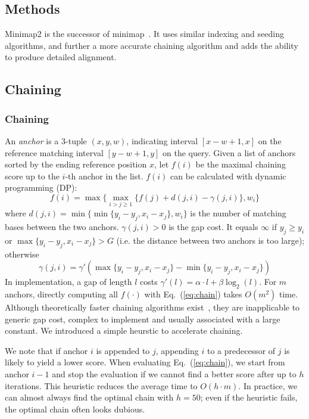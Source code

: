 \documentclass{bioinfo}
\begin{document}
\begin{methods}
\section{Methods}

Minimap2 is the successor of minimap~\citep{Li:2016aa}. It uses similar
indexing and seeding algorithms, and further a more accurate chaining algorithm
and adds the ability to produce detailed alignment.

\subsection{Chaining}

\subsubsection{Chaining}
An \emph{anchor} is a 3-tuple $(x,y,w)$, indicating interval $[x-w+1,x]$ on the
reference matching interval $[y-w+1,y]$ on the query. Given a list of anchors
sorted by the ending reference position $x$, let $f(i)$ be the maximal chaining
score up to the $i$-th anchor in the list. $f(i)$ can be calculated with
dynamic programming (DP):
\begin{equation}\label{eq:chain}
f(i)=\max\big\{\max_{i>j\ge 1} \{ f(j)+d(j,i)-\gamma(j,i) \},w_i\big\}
\end{equation}
where $d(j,i)=\min\big\{\min\{y_i-y_j,x_i-x_j\},w_i\big\}$ is the number of
matching bases between the two anchors. $\gamma(j,i)>0$ is the gap cost. It
equals $\infty$ if $y_j\ge y_i$ or $\max\{y_i-y_j,x_i-x_j\}>G$ (i.e. the
distance between two anchors is too large); otherwise
\[
\gamma(j,i)=\gamma'(\max\{y_i-y_j,x_i-x_j\}-\min\{y_i-y_j,x_i-x_j\})
\]
In implementation, a gap of length $l$ costs $\gamma'(l)=\alpha\cdot
l+\beta\log_2(l)$. For $m$ anchors, directly computing all $f(\cdot)$ with
Eq.~(\ref{eq:chain}) takes $O(m^2)$ time. Although theoretically faster
chaining algorithms exist~\citep{Abouelhoda:2005aa}, they
are inapplicable to generic gap cost, complex to implement and usually
associated with a large constant. We introduced a simple heurstic to accelerate
chaining.

We note that if anchor $i$ is appended to $j$, appending $i$ to a predecessor
of $j$ is likely to yield a lower score. When evaluating Eq.~(\ref{eq:chain}),
we start from anchor $i-1$ and stop the evaluation if we cannot find a better
score after up to $h$ iterations. This heuristic reduces the average time to
$O(h\cdot m)$. In practice, we can almost always find the optimal chain with
$h=50$; even if the heuristic fails, the optimal chain often looks dubious.


\end{methods}
\end{document}
